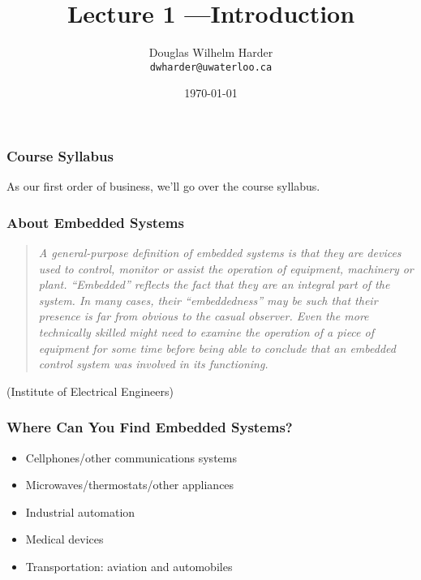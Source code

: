 

\title{Lecture 1 ---Introduction}

\author[Lam]{Douglas Wilhelm Harder \\ \small \texttt{dwharder@uwaterloo.ca}}
\date{\today}




\begin{frame}
  \titlepage

 \end{frame}

\begin{frame}
\frametitle{Course Syllabus}
As our first order of business, we'll go over the course syllabus.
\end{frame}

\begin{frame}
\frametitle{About Embedded Systems}

\begin{quote}
    \emph{A general-purpose definition of embedded systems is that they
      are devices used to control, monitor or assist the operation of
      equipment, machinery or plant. ``Embedded'' reflects the fact that
      they are an integral part of the system. In many cases, their
      ``embeddedness'' may be such that their presence is far from
      obvious to the casual observer. Even the more technically skilled
      might need to examine the operation of a piece of equipment for
      some time before being able to conclude that an embedded control
      system was involved in its functioning.}
\end{quote}
\hfill(Institute of Electrical Engineers)

\end{frame}

\begin{frame}
\frametitle{Where Can You Find Embedded Systems?}
\begin{itemize}
	\item Cellphones/other communications systems
	\item Microwaves/thermostats/other appliances
	\item Industrial automation
	\item Medical devices
	\item Transportation: aviation and automobiles
\end{itemize}
\end{frame}


